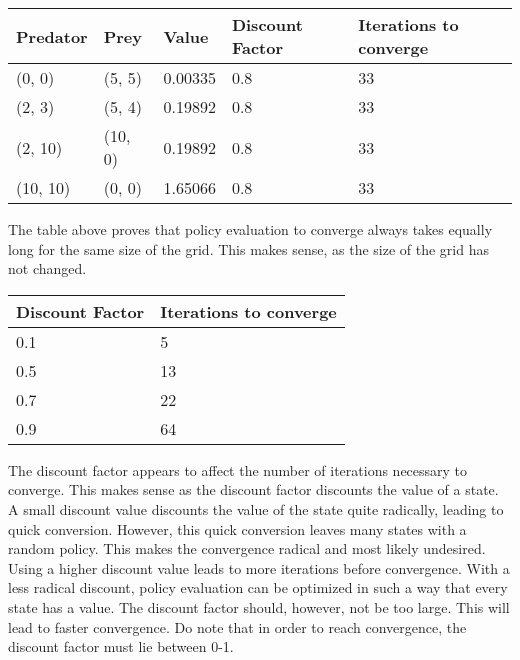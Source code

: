 \documentclass{article}
\begin{document}
\begin{center}
	\begin{tabular}{ l | l | l | l | l }
		Predator & Prey & Value & Discount Factor & Iterations to converge \\ 
		\hline
		(0, 0) & (5, 5) & 0.00335 & 0.8 & 33 \\
		(2, 3) & (5, 4) & 0.19892 & 0.8 & 33 \\
		(2, 10) & (10, 0) & 0.19892 & 0.8 & 33 \\
		(10, 10) & (0, 0) & 1.65066 & 0.8 & 33 \\	
	\end{tabular}
\end{center}

The table above proves that policy evaluation to converge always takes equally long for the same size of the grid. This makes sense, as the size of the grid has not changed.


\begin{center}
	\begin{tabular}{ l || l }
		Discount Factor & Iterations to converge \\ 
		\hline
		0.1 & 5 \\
		0.5 & 13 \\
		0.7 & 22 \\
		0.9 & 64 \\	
	\end{tabular}
\end{center}

The discount factor appears to affect the number of iterations necessary to converge. This makes sense as the discount factor discounts the value of a state. A small discount value discounts the value of the state quite radically, leading to quick conversion. However, this quick conversion leaves many states with a random policy. This makes the convergence radical and most likely undesired. Using a higher discount value leads to more iterations before convergence. With a less radical discount, policy evaluation can be optimized in such a way that every state has a value. The discount factor should, however, not be too large. This will lead to faster convergence. Do note that in order to reach convergence, the discount factor must lie between 0-1.
\end{document}
